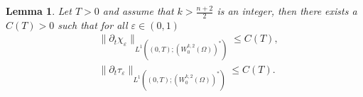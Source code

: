 \documentclass[a4paper,10pt]{article}
\newtheorem{Lemma}[Theorem]{Lemma}
\theoremstyle{definition}
\begin{document}
\begin{Lemma}
  \label{eind_ht}
  Let $T > 0$ and assume that $k > \frac{n + 2}{2}$ is an integer, then there exists a $C(T) > 0$ such that for all $\varepsilon \in (0, 1)$
\begin{align}
    & \label{chi_com_bound} \|\partial_t \chi_\varepsilon\|_{L^1((0, T); (W_0^{k, 2}(\Omega))^\ast)} \leq C(T),                \\[5pt]
    & \label{tau_com_bound} \|\partial_t \tau_\varepsilon\|_{L^1((0, T); (W_0^{k, 2}(\Omega))^\ast)} \leq C(T).
  \end{align}
\end{Lemma}
\end{document}
